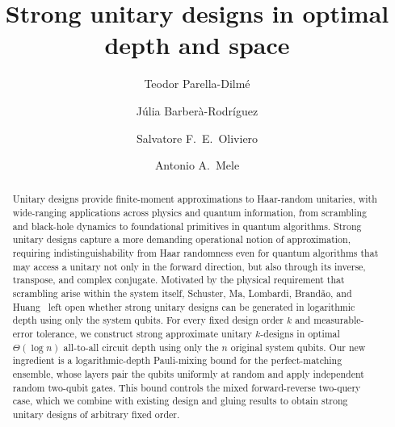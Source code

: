 \documentclass[
    aps,
    superscriptaddress,
    onecolumn,
    10pt,
    prx,
    nofootinbib
]{revtex4-2}
\theoremstyle{namedstatement}
\theoremstyle{plain}
\begin{document}
\title{Strong unitary designs in optimal depth and space}

\author{Teodor Parella-Dilmé}

\author{Júlia Barberà-Rodríguez}

\author{Salvatore F.~E.~Oliviero}

\author{Antonio A.~Mele}




\begin{abstract}
Unitary designs provide finite-moment approximations to Haar-random unitaries, with wide-ranging applications across physics and quantum information, from scrambling and black-hole dynamics to foundational primitives in quantum algorithms. Strong unitary designs capture a more demanding operational notion of approximation, requiring indistinguishability from Haar randomness even for quantum algorithms that may access a unitary not only in the forward direction, but also through its inverse, transpose, and complex conjugate. Motivated by the physical requirement that scrambling arise within the system itself, Schuster, Ma, Lombardi, Brandão, and Huang~\cite{SchusterEtAlStrong2025} left open whether strong unitary designs can be generated in logarithmic depth using only the system qubits.
For every fixed design order $k$ and measurable-error tolerance, we construct strong approximate unitary $k$-designs in optimal $\Theta(\log n)$ all-to-all circuit depth using only the $n$ original system qubits.
Our new ingredient is a logarithmic-depth Pauli-mixing bound for the perfect-matching ensemble, whose layers pair the qubits uniformly at random and apply independent random two-qubit gates. This bound controls the mixed forward-reverse two-query case, which we combine with existing design and gluing results to obtain strong unitary designs of arbitrary fixed order.
\end{abstract}
\end{document}
